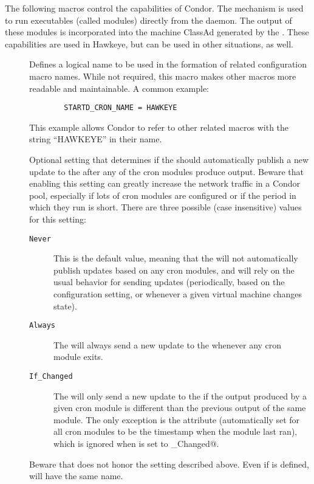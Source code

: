 The following macros control the  capabilities of Condor.
The  mechanism is used to run executables (called
modules) directly from the  daemon.
The output of these modules
is incorporated into the machine ClassAd generated by the
.  These capabilities are used in Hawkeye, but can be
used in other situations, as well.

\begin{description}

\item[]
\label{param:StartdCronName}
  Defines a logical name to be used in the formation of related
  configuration macro names. While
  not required, this macro makes other macros
  more readable and maintainable.  A common example:
\begin{verbatim}
        STARTD_CRON_NAME = HAWKEYE
\end{verbatim}
  This example allows Condor to refer to other related macros
  with the string ``HAWKEYE'' in their name.

\item[]
\label{param:StartdCronAutopublish}
   Optional setting that determines if the  should
   automatically publish a new update to the  after
   any of the cron modules produce output.
   Beware that enabling this setting can greatly increase the network
   traffic in a Condor pool, especially if lots of cron modules are
   configured or if the period in which they run is short.
   There are three possible (case insensitive) values for this
   setting: 
   \begin{description}
     \item[\texttt{Never}] This is the default value, meaning that the
      will not automatically publish updates based on
     any cron modules, and will rely on the usual behavior for sending
     updates (periodically, based on the 
     configuration setting, or whenever a given virtual machine
     changes state).
     \item[\texttt{Always}] The  will always send a new
     update to the  whenever any cron module exits.
     \item[\texttt{If\_Changed}] The  will only send a
     new update to the  if the output produced by a
     given cron module is different than the previous output of the
     same module.
     The only exception is the  attribute
     (automatically set for all cron modules to be the timestamp when
     the module last ran), which is ignored when
      is set to \verb@If_Changed@.
   \end{description}
   Beware that  does not honor the
    setting described above.
   Even if  is defined,
    will have the same name.


\end{description}
